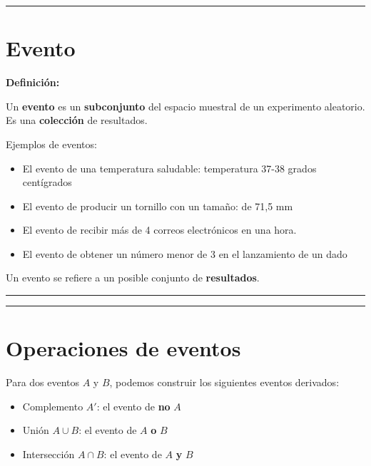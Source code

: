 \documentclass[
]{book}
\providecommand{\tightlist}{%
  \setlength{\itemsep}{0pt}\setlength{\parskip}{0pt}}
\begin{document}
\begin{center}\rule{0.5\linewidth}{0.5pt}\end{center}

\hypertarget{evento}{%
\section{Evento}\label{evento}}

\textbf{Definición:}

Un \textbf{evento} es un \textbf{subconjunto} del espacio muestral de un experimento aleatorio. Es una \textbf{colección} de resultados.

Ejemplos de eventos:

\begin{itemize}
\tightlist
\item
  El evento de una temperatura saludable: temperatura 37-38 grados centígrados
\item
  El evento de producir un tornillo con un tamaño: de 71,5 mm
\item
  El evento de recibir más de 4 correos electrónicos en una hora.
\item
  El evento de obtener un número menor de 3 en el lanzamiento de un dado
\end{itemize}

Un evento se refiere a un posible conjunto de \textbf{resultados}.

\begin{center}\rule{0.5\linewidth}{0.5pt}\end{center}

\begin{center}\rule{0.5\linewidth}{0.5pt}\end{center}

\hypertarget{operaciones-de-eventos}{%
\section{Operaciones de eventos}\label{operaciones-de-eventos}}

Para dos eventos \(A\) y \(B\), podemos construir los siguientes eventos derivados:

\begin{itemize}
\tightlist
\item
  Complemento \(A'\): el evento de \textbf{no} \(A\)
\item
  Unión \(A \cup B\): el evento de \(A\) \textbf{o} \(B\)
\item
  Intersección \(A \cap B\): el evento de \(A\) \textbf{y} \(B\)
\end{itemize}
\end{document}

